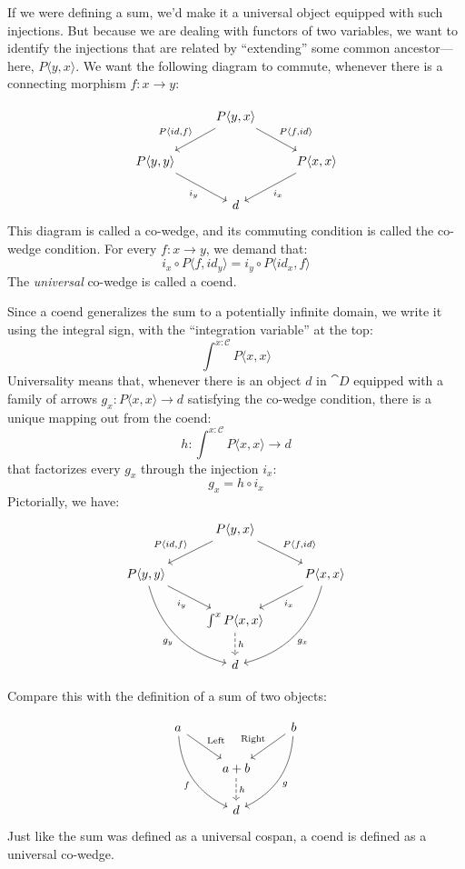 \documentclass[DaoFP]{subfiles}
\begin{document}
If we were defining a sum, we'd make it a universal object equipped with such injections. But because we are dealing with functors of two variables, we want to identify the injections that are related by ``extending'' some common ancestor---here, $P \langle y, x \rangle$. We want the following diagram to commute, whenever there is a connecting morphism $f\colon x \to y$:

\[
 \begin{tikzcd}
 &P \langle y, x \rangle
 \arrow[ld, "{P \langle id, f \rangle}"']
 \arrow[rd, "{P \langle f, id \rangle}"]
 \\
 P \langle y, y \rangle
 \arrow[dr, "i_y"']
 &&P \langle x, x \rangle
 \arrow[dl, "i_x"]
 \\
 &d
 \end{tikzcd}
\]
This diagram is called a co-wedge, and its commuting condition is called the co-wedge condition. For every $f \colon x \to y$, we demand that:
\[ i_x \circ P \langle f, id_y \rangle = i_y \circ P \langle id_x, f \rangle \]
The \emph{universal} co-wedge is called a coend.

Since a coend generalizes the sum to a potentially infinite domain, we write it using the integral sign, with the ``integration variable'' at the top:
\[ \int^{x\colon \mathcal{C}} P \langle x, x \rangle \]
Universality means that, whenever there is an object $d$ in $\cat D$ equipped with a family of arrows $g_x \colon P \langle x, x \rangle \to d$ satisfying the co-wedge condition, there is a unique mapping out from the coend:
\[ h \colon \int^{x\colon \mathcal{C}} P \langle x, x \rangle \to d \]
that factorizes every $g_x$ through the injection $i_x$:
\[ g_x = h \circ i_x \]
Pictorially, we have:
\[
 \begin{tikzcd}
 &P \langle y, x \rangle
 \arrow[ld, "{P \langle id, f \rangle}"']
 \arrow[rd, "{P \langle f, id \rangle}"]
 \\
 P \langle y, y \rangle
 \arrow[dr, "i_y"']
 \arrow[ddr, bend right,  "g_y"']
 &&P \langle x, x \rangle
 \arrow[dl, "i_x"]
 \arrow[ddl, bend left,  "g_x"]
 \\
 &\int^x P \langle x, x \rangle
 \arrow[d, dashed, "h"]
 \\
 &d
 \end{tikzcd}
\]

Compare this with the definition of a sum of two objects:

\[
 \begin{tikzcd}
 a
 \arrow[dr, "\text{Left}"]
 \arrow[ddr, bend right, "f"']
 && b
 \arrow[dl, "\text{Right}"']
 \arrow[ddl, bend left, "g"]
 \\
&a + b
\arrow[d, dashed, "h"]
\\
& d
 \end{tikzcd}
\]
Just like the sum was defined as a universal cospan, a coend is defined as a universal co-wedge. 
\end{document}
